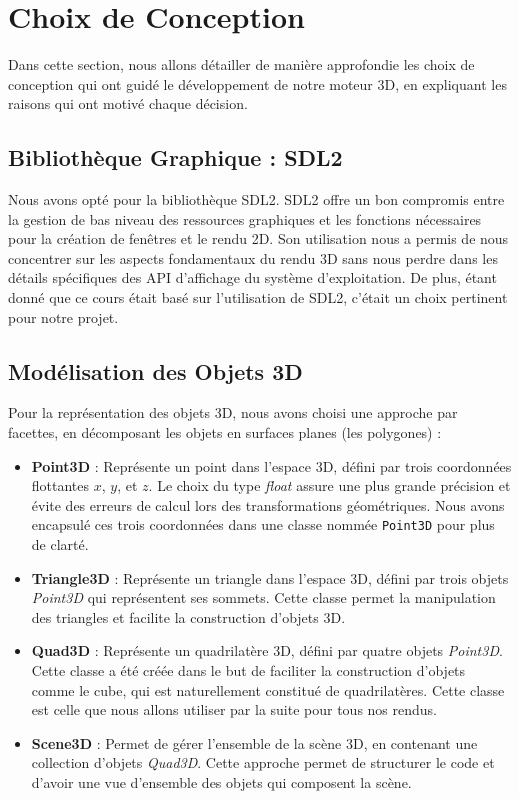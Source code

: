 \documentclass[12pt]{article}
\begin{document}
\section{Choix de Conception}
\label{sec:choix_conception}

\noindent Dans cette section, nous allons détailler de manière approfondie les choix de conception qui ont guidé le développement de notre moteur 3D, en expliquant les raisons qui ont motivé chaque décision.

\subsection{Bibliothèque Graphique : SDL2}
\label{subsec:bibliotheque_graphique}

\noindent Nous avons opté pour la bibliothèque SDL2. SDL2 offre un bon compromis entre la gestion de bas niveau des ressources graphiques et les fonctions nécessaires pour la création de fenêtres et le rendu 2D. Son utilisation nous a permis de nous concentrer sur les aspects fondamentaux du rendu 3D sans nous perdre dans les détails spécifiques des API d'affichage du système d'exploitation. De plus, étant donné que ce cours était basé sur l'utilisation de SDL2, c'était un choix pertinent pour notre projet.

\subsection{Modélisation des Objets 3D}
\label{subsec:modelisation_objets}

\noindent Pour la représentation des objets 3D, nous avons choisi une approche par facettes, en décomposant les objets en surfaces planes (les polygones) :
\begin{itemize}
    \item \textbf{Point3D} : Représente un point dans l'espace 3D, défini par trois coordonnées flottantes $x$, $y$, et $z$. Le choix du type \textit{float} assure une plus grande précision et évite des erreurs de calcul lors des transformations géométriques. Nous avons encapsulé ces trois coordonnées dans une classe nommée \texttt{Point3D} pour plus de clarté.
    \item \textbf{Triangle3D} : Représente un triangle dans l'espace 3D, défini par trois objets \textit{Point3D} qui représentent ses sommets. Cette classe permet la manipulation des triangles et facilite la construction d'objets 3D. 
    \item \textbf{Quad3D} : Représente un quadrilatère 3D, défini par quatre objets \textit{Point3D}. Cette classe a été créée dans le but de faciliter la construction d'objets comme le cube, qui est naturellement constitué de quadrilatères. Cette classe est celle que nous allons utiliser par la suite pour tous nos rendus.
    \item \textbf{Scene3D} : Permet de gérer l'ensemble de la scène 3D, en contenant une collection d'objets \textit{Quad3D}. Cette approche permet de structurer le code et d'avoir une vue d'ensemble des objets qui composent la scène.
\end{itemize}
\end{document}
